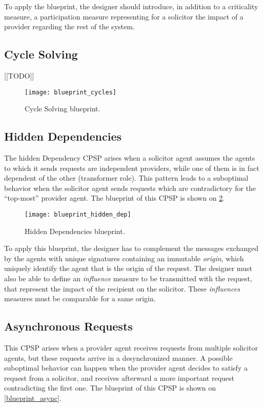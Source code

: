 To apply the blueprint, the designer should introduce, in addition to a criticality measure, a participation measure representing for a solicitor the impact of a provider regarding the rest of the system.

\subsection{Cycle Solving}

[[TODO]]

\begin{figure}
\centering
\texttt{[image: blueprint\_cycles]}
\caption{Cycle Solving blueprint.}\label{blueprint_cycles}
\end{figure}

\subsection{Hidden Dependencies}

The hidden Dependency CPSP arises when a solicitor agent assumes the agents to which it sends requests are independent providers, while one of them is in fact dependent of the other (transformer role). This pattern leads to a suboptimal behavior when the solicitor agent sends requests which are contradictory for the \enquote{top-most} provider agent. The blueprint of this CPSP is shown on \figurename{} \ref{blueprint_hidden_dep}.

\begin{figure}
\centering
\texttt{[image: blueprint\_hidden\_dep]}
\caption{Hidden Dependencies blueprint.}\label{blueprint_hidden_dep}
\end{figure}

To apply this blueprint, the designer has to complement the messages exchanged by the agents with unique signatures containing an immutable \emph{origin}, which uniquely identify the agent that is the origin of the request. The designer must also be able to define an \emph{influence} measure to be transmitted with the request, that represent the impact of the recipient on the solicitor. These \emph{influences} measures must be comparable for a same origin.

\subsection{Asynchronous Requests}

This CPSP arises when a provider agent receives requests from multiple solicitor agents, but these requests arrive in a desynchronized manner. A possible suboptimal behavior can happen when the provider agent decides to satisfy a request from a solicitor, and receives afterward a more important request contradicting the first one. The blueprint of this CPSP is shown on \figurename{} \ref{blueprint_async}.

